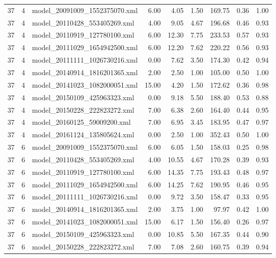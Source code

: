 \begin{table}[ht]
\begin{tabular}{rrlrrrrrr}
   37 &   4 & model\_20091009\_1552375070.xml & 6.00 & 4.05 & 1.50 & 169.75 & 0.36 & 1.00 \\ 
   37 &   4 & model\_20110428\_553405269.xml & 4.00 & 9.05 & 4.67 & 196.68 & 0.46 & 0.93 \\ 
   37 &   4 & model\_20110919\_127780100.xml & 6.00 & 12.30 & 7.75 & 233.53 & 0.57 & 0.93 \\ 
   37 &   4 & model\_20111029\_1654942500.xml & 6.00 & 12.20 & 7.62 & 220.22 & 0.56 & 0.93 \\ 
   37 &   4 & model\_20111111\_1026730216.xml & 0.00 & 7.62 & 3.50 & 174.30 & 0.42 & 0.94 \\ 
   37 &   4 & model\_20140914\_1816201365.xml & 2.00 & 2.50 & 1.00 & 105.00 & 0.50 & 1.00 \\ 
   37 &   4 & model\_20141023\_1082000051.xml & 15.00 & 4.20 & 1.50 & 172.62 & 0.36 & 0.98 \\ 
   37 &   4 & model\_20150109\_425963323.xml & 0.00 & 9.18 & 5.50 & 188.40 & 0.53 & 0.88 \\ 
   37 &   4 & model\_20150228\_222823272.xml & 7.00 & 6.38 & 2.60 & 164.40 & 0.44 & 0.95 \\ 
   37 &   4 & model\_20160125\_59009200.xml & 7.00 & 6.95 & 3.45 & 183.95 & 0.47 & 0.97 \\ 
   37 &   4 & model\_20161124\_135805624.xml & 0.00 & 2.50 & 1.00 & 352.43 & 0.50 & 1.00 \\ 
   37 &   6 & model\_20091009\_1552375070.xml & 6.00 & 6.05 & 1.50 & 158.03 & 0.25 & 0.98 \\ 
   37 &   6 & model\_20110428\_553405269.xml & 4.00 & 10.55 & 4.67 & 170.28 & 0.39 & 0.93 \\ 
   37 &   6 & model\_20110919\_127780100.xml & 6.00 & 14.35 & 7.75 & 193.43 & 0.48 & 0.97 \\ 
   37 &   6 & model\_20111029\_1654942500.xml & 6.00 & 14.25 & 7.62 & 190.95 & 0.46 & 0.95 \\ 
   37 &   6 & model\_20111111\_1026730216.xml & 0.00 & 9.72 & 3.50 & 158.47 & 0.33 & 0.95 \\ 
   37 &   6 & model\_20140914\_1816201365.xml & 2.00 & 3.75 & 1.00 & 97.97 & 0.42 & 1.00 \\ 
   37 &   6 & model\_20141023\_1082000051.xml & 15.00 & 6.17 & 1.50 & 156.40 & 0.26 & 0.97 \\ 
   37 &   6 & model\_20150109\_425963323.xml & 0.00 & 10.85 & 5.50 & 167.35 & 0.44 & 0.90 \\ 
   37 &   6 & model\_20150228\_222823272.xml & 7.00 & 7.08 & 2.60 & 160.75 & 0.39 & 0.94 \\ 

\end{tabular}
\end{table}
